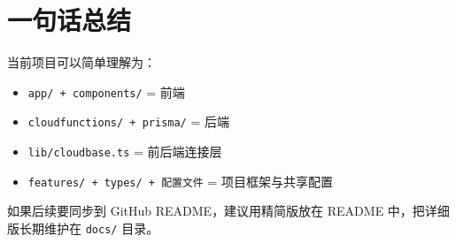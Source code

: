 \documentclass[11pt,a4paper]{ctexart}
\begin{document}
\section{一句话总结}

当前项目可以简单理解为：

\begin{itemize}
  \item \texttt{app/ + components/} = 前端
  \item \texttt{cloudfunctions/ + prisma/} = 后端
  \item \texttt{lib/cloudbase.ts} = 前后端连接层
  \item \texttt{features/ + types/ + 配置文件} = 项目框架与共享配置
\end{itemize}

如果后续要同步到 GitHub README，建议用精简版放在 README 中，把详细版长期维护在 \texttt{docs/} 目录。
\end{document}
